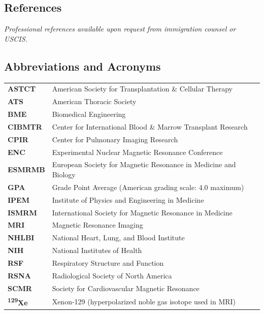 \documentclass[11pt,]{scrartcl}
\begin{document}
\subsection{References}

\textit{Professional references available upon request from immigration counsel or USCIS.}

\newpage

\subsection{Abbreviations and Acronyms}

\begin{table}[h!]
{\def\arraystretch{1.3}\tabcolsep=8pt
\begin{tabular}{p{0.15\linewidth}p{0.85\linewidth}}
    \textbf{ASTCT} & American Society for Transplantation \& Cellular Therapy \\
    \textbf{ATS} & American Thoracic Society \\
    \textbf{BME} & Biomedical Engineering \\
    \textbf{CIBMTR} & Center for International Blood \& Marrow Transplant Research \\
    \textbf{CPIR} & Center for Pulmonary Imaging Research \\
    \textbf{ENC} & Experimental Nuclear Magnetic Resonance Conference \\
    \textbf{ESMRMB} & European Society for Magnetic Resonance in Medicine and Biology \\
    \textbf{GPA} & Grade Point Average (American grading scale: 4.0 maximum) \\
    \textbf{IPEM} & Institute of Physics and Engineering in Medicine \\
    \textbf{ISMRM} & International Society for Magnetic Resonance in Medicine \\
    \textbf{MRI} & Magnetic Resonance Imaging \\
    \textbf{NHLBI} & National Heart, Lung, and Blood Institute \\
    \textbf{NIH} & National Institutes of Health \\
    \textbf{RSF} & Respiratory Structure and Function \\
    \textbf{RSNA} & Radiological Society of North America \\
    \textbf{SCMR} & Society for Cardiovascular Magnetic Resonance \\
    \textbf{\textsuperscript{129}Xe} & Xenon-129 (hyperpolarized noble gas isotope used in MRI) \\
\end{tabular}%
}
\end{table}
\end{document}

